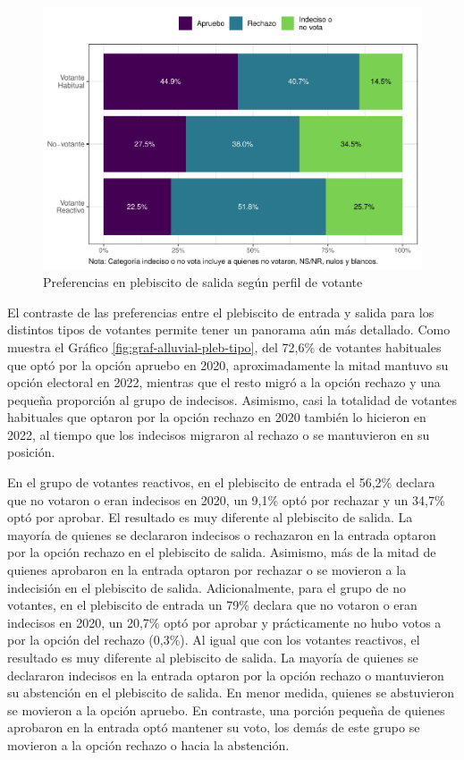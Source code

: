 \documentclass[
  12pt,
]{book}
\begin{document}
\begin{figure}

{\centering \includegraphics{reporte-elsoc_files/figure-latex/graf-tipo-salida-1} 

}

\caption{Preferencias en plebiscito de salida según perfil de votante}\label{fig:graf-tipo-salida}
\end{figure}

El contraste de las preferencias entre el plebiscito de entrada y salida para los distintos tipos de votantes permite tener un panorama aún más detallado. Como muestra el Gráfico \ref{fig:graf-alluvial-pleb-tipo}, del 72,6\% de votantes habituales que optó por la opción apruebo en 2020, aproximadamente la mitad mantuvo su opción electoral en 2022, mientras que el resto migró a la opción rechazo y una pequeña proporción al grupo de indecisos. Asimismo, casi la totalidad de votantes habituales que optaron por la opción rechazo en 2020 también lo hicieron en 2022, al tiempo que los indecisos migraron al rechazo o se mantuvieron en su posición.

En el grupo de votantes reactivos, en el plebiscito de entrada el 56,2\% declara que no votaron o eran indecisos en 2020, un 9,1\% optó por rechazar y un 34,7\% optó por aprobar. El resultado es muy diferente al plebiscito de salida. La mayoría de quienes se declararon indecisos o rechazaron en la entrada optaron por la opción rechazo en el plebiscito de salida. Asimismo, más de la mitad de quienes aprobaron en la entrada optaron por rechazar o se movieron a la indecisión en el plebiscito de salida. Adicionalmente, para el grupo de no votantes, en el plebiscito de entrada un 79\% declara que no votaron o eran indecisos en 2020, un 20,7\% optó por aprobar y prácticamente no hubo votos a por la opción del rechazo (0,3\%). Al igual que con los votantes reactivos, el resultado es muy diferente al plebiscito de salida. La mayoría de quienes se declararon indecisos en la entrada optaron por la opción rechazo o mantuvieron su abstención en el plebiscito de salida. En menor medida, quienes se abstuvieron se movieron a la opción apruebo. En contraste, una porción pequeña de quienes aprobaron en la entrada optó mantener su voto, los demás de este grupo se movieron a la opción rechazo o hacia la abstención.
\end{document}

